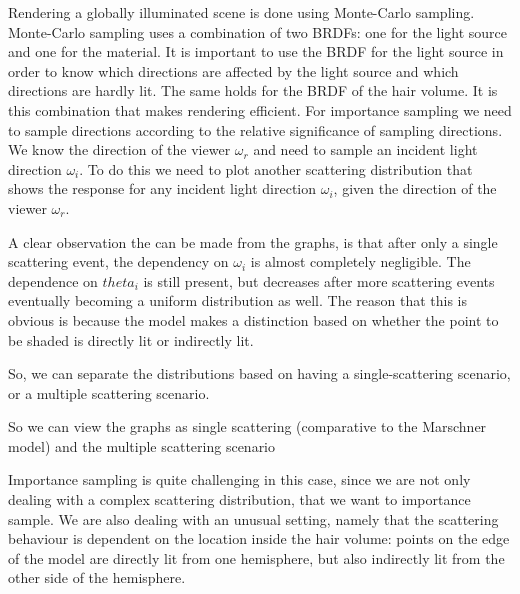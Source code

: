 \documentclass[11pt,a4paper]{report}
\begin{document}
Rendering a globally illuminated scene is done using Monte-Carlo sampling. Monte-Carlo sampling uses a combination of two BRDFs: one for the light source and one for the material. It is important to use the BRDF for the light source in order to know which directions are affected by the light source and which directions are hardly lit. The same holds for the BRDF of the hair volume. It is this combination that makes rendering efficient. For importance sampling we need to sample directions according to the relative significance of sampling directions. We know the direction of the viewer $\omega_r$ and need to sample an incident light direction $\omega_i$. To do this we need to plot another scattering distribution that shows the response for any incident light direction $\omega_i$, given the direction of the viewer $\omega_r$.















A clear observation the can be made from the graphs, is that after only a single scattering event, the dependency on $\omega_i$ is almost completely negligible. The dependence on $theta_i$ is still present, but decreases after more scattering events eventually becoming a uniform distribution as well. The reason that this is obvious is because the model makes a distinction based on whether the point to be shaded is directly lit or indirectly lit.

So, we can separate the distributions based on having a single-scattering scenario, or a multiple scattering scenario.


So we can view the graphs as single scattering (comparative to the Marschner model) and the multiple scattering scenario 


Importance sampling is quite challenging in this case, since we are not only dealing with a complex scattering distribution, that we want to importance sample. We are also dealing with an unusual setting, namely that the scattering behaviour is dependent on the location inside the hair volume: points on the edge of the model are directly lit from one hemisphere, but also indirectly lit from the other side of the hemisphere.
\end{document}
